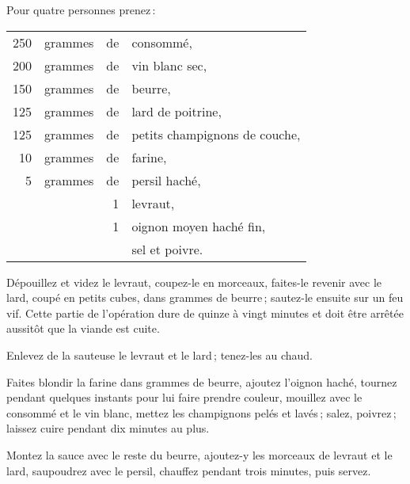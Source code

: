 Pour quatre personnes prenez :

\footnotesize
\begin{longtable}{rrrp{16em}}
    250 & grammes & de & consommé,                                                                        \\
    200 & grammes & de & vin blanc sec,                                                                   \\
    150 & grammes & de & beurre,                                                                          \\
    125 & grammes & de & lard de poitrine,                                                                \\
    125 & grammes & de & petits champignons de couche,                                                    \\
     10 & grammes & de & farine,                                                                          \\
      5 & grammes & de & persil haché,                                                                    \\
        &         &  1 & levraut,                                                                         \\
        &         &  1 & oignon moyen haché fin,                                                          \\
        &         &    & sel et poivre.                                                                   \\
\end{longtable}
\normalsize

Dépouillez et videz le levraut, coupez-le en morceaux, faites-le revenir avec
le lard, coupé en petits cubes, dans {\mmm} grammes de beurre ;
sautez-le ensuite sur un feu vif. Cette partie de l'opération dure de quinze
à vingt minutes et doit être arrêtée aussitôt que la viande est cuite.

Enlevez de la sauteuse le levraut et le lard ; tenez-les au chaud.

Faites blondir la farine dans {\mmm} grammes de beurre, ajoutez l'oignon
haché, tournez pendant quelques instants pour lui faire prendre couleur,
mouillez avec le consommé et le vin blanc, mettez les champignons pelés et
lavés ; salez, poivrez ; laissez cuire pendant dix minutes au plus.

Montez la sauce avec le reste du beurre, ajoutez-y les morceaux de levraut et
le lard, saupoudrez avec le persil, chauffez pendant trois minutes, puis
servez.


